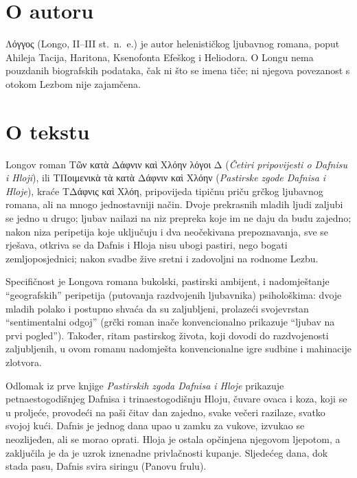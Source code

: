 \section*{O autoru}

Λόγγος (Longo, II–III st.\ n.~e.) je autor helenističkog ljubavnog romana, poput Ahileja Tacija, Haritona, Ksenofonta Efeškog i Heliodora. O Longu nema pouzdanih biografskih podataka, čak ni što se imena tiče; ni njegova povezanost s otokom Lezbom nije zajamčena.

\section*{O tekstu}

Longov roman \textgreek{Τῶν κατὰ Δάφνιν καὶ Χλόην λόγοι Δ} (\textit{Četiri pripovijesti o Dafnisu i Hloji}), ili \textgreek{ΤΠοιμενικὰ τὰ κατὰ Δάφνιν καὶ Χλόην} (\textit{Pastirske zgode Dafnisa i Hloje}), kraće \textgreek{ΤΔάφνις καὶ Χλόη,} pripovijeda tipičnu priču grčkog ljubavnog romana, ali na mnogo jednostavniji način. Dvoje prekrasnih mladih ljudi zaljubi se jedno u drugo; ljubav nailazi na niz prepreka koje im ne daju da budu zajedno; nakon niza peripetija koje uključuju i dva neočekivana prepoznavanja, sve se rješava, otkriva se da Dafnis i Hloja nisu ubogi pastiri, nego bogati zemljoposjednici; nakon svadbe žive sretni i zadovoljni na rodnome Lezbu.

Specifičnost je Longova romana bukolski, pastirski ambijent, i nadomještanje ``geografskih'' peripetija (putovanja razdvojenih ljubavnika) psihološkima: dvoje mladih polako i postupno shvaća da su zaljubljeni, prolazeći svojevrstan ``sentimentalni odgoj'' (grčki roman inače konvencionalno prikazuje ``ljubav na prvi pogled''). Također, ritam pastirskog života, koji dovodi do razdvojenosti zaljubljenih, u ovom romanu nadomješta konvencionalne igre sudbine i mahinacije zlotvora.

Odlomak iz prve knjige \textit{Pastirskih zgoda Dafnisa i Hloje} prikazuje petnaestogodišnjeg Dafnisa i trinaestogodišnju Hloju, čuvare ovaca i koza, koji se u proljeće, provodeći na paši čitav dan zajedno, svake večeri razilaze, svatko svojoj kući. Dafnis je jednog dana upao u zamku za vukove, izvukao se neozlijeđen, ali se morao oprati. Hloja je ostala opčinjena njegovom ljepotom, a zaključila je da je uzrok iznenadne privlačnosti kupanje. Sljedećeg dana, dok stada pasu, Dafnis svira siringu (Panovu frulu).


